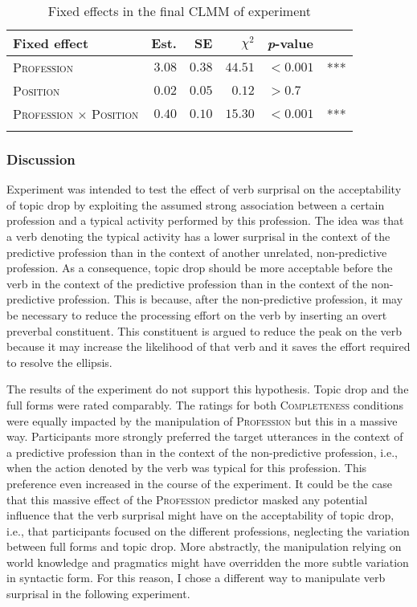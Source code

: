 \begin{table}
\caption{Fixed effects in the final CLMM of experiment }
\centering
\begin{tabular}{lrrrll}
\lsptoprule
Fixed effect & Est. & SE & $\chi^2$ & \textit{p}-value &   \\
\midrule
\textsc{Profession} & $3.08$ & $0.38$ & $44.51$ & $< 0.001$ & *** \\
\textsc{Position} & $0.02$ & $0.05$ & $0.12$ & $> 0.7$ & \\
\textsc{Profession $\times$ Position} & $0.40$ & $0.10$ & $15.30$ & $< 0.001$ & *** \\
\lspbottomrule
\end{tabular}
\label{tab:model.exp.vs}
\end{table}

\subsubsection{Discussion}
Experiment  was intended to test the effect of verb surprisal on the acceptability of topic drop by exploiting the assumed strong association between a certain profession and a typical activity performed by this profession.
The idea was that a verb denoting the typical activity has a lower surprisal in the context of the predictive profession than in the context of another unrelated, non-predictive profession.
As a consequence, topic drop should be more acceptable before the verb in the context of the predictive profession than in the context of the non-predictive profession.
This is because, after the non-predictive profession, it may be necessary to reduce the processing effort  on the verb by inserting an overt preverbal constituent.
This constituent is argued to reduce the peak on the verb because it may increase the likelihood of that verb and it saves the effort  required to resolve the ellipsis. 

The results of the experiment do not support this hypothesis.
Topic drop and the full forms were rated comparably.
The ratings for both \textsc{Completeness} conditions were equally impacted by the manipulation of \textsc{Profession} but this in a massive way.
Participants more strongly preferred the target utterances in the context of a predictive profession than in the context of the non-predictive profession, i.e., when the action denoted by the verb was typical for this profession.
This preference even increased in the course of the experiment.
It could be the case that this massive effect of the \textsc{Profession} predictor masked any potential influence that the verb surprisal might have on the acceptability of topic drop, i.e., that participants focused on the different professions, neglecting the variation between full forms and topic drop.
More abstractly, the manipulation relying on world knowledge and pragmatics might have overridden the more subtle variation in syntactic form.
For this reason, I chose a different way to manipulate verb surprisal in the following experiment. 


